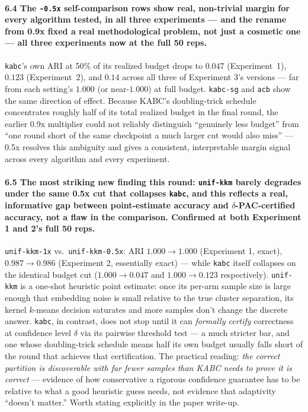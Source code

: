 \documentclass[11pt]{article}
\begin{document}
\paragraph{6.4 The \texttt{-0.5x} self-comparison rows show real,
non-trivial margin for every algorithm tested, in all three experiments
--- and the rename from 0.9x fixed a real methodological problem, not just
a cosmetic one --- all three experiments now at the full 50 reps.}
\texttt{kabc}'s own ARI at 50\% of its realized budget drops to $0.047$
(Experiment~1), $0.123$ (Experiment~2), and $0.14$ across all three of
Experiment 3's versions --- far from each setting's $1.000$ (or
near-$1.000$) at full budget. \texttt{kabc-sg} and \texttt{acb} show the
same direction of
effect. Because KABC's doubling-trick schedule concentrates roughly half
of its total realized budget in the final round, the earlier 0.9x
multiplier could not reliably distinguish ``genuinely less budget'' from
``one round short of the same checkpoint a much larger cut would also
miss'' --- 0.5x resolves this ambiguity and gives a consistent,
interpretable margin signal across every algorithm and every experiment.

\paragraph{6.5 The most striking new finding this round: \texttt{unif-kkm}
barely degrades under the same 0.5x cut that collapses \texttt{kabc}, and
this reflects a real, informative gap between point-estimate accuracy and
$\delta$-PAC-certified accuracy, not a flaw in the comparison. Confirmed
at both Experiment 1 and 2's full 50 reps.} \texttt{unif-kkm-1x} vs.\
\texttt{unif-kkm-0.5x}: ARI $1.000\to1.000$ (Experiment 1, exact),
$0.987\to0.986$ (Experiment 2, essentially exact) --- while \texttt{kabc}
itself collapses on the identical budget cut ($1.000\to0.047$ and
$1.000\to0.123$ respectively). \texttt{unif-kkm} is a
one-shot heuristic point estimate: once its per-arm sample size is large
enough that embedding noise is small relative to the true cluster
separation, its kernel $k$-means decision saturates and more samples don't
change the discrete answer. \texttt{kabc}, in contrast, does not stop
until it can \emph{formally certify} correctness at confidence level
$\delta$ via its pairwise threshold test --- a much stricter bar, and one
whose doubling-trick schedule means half its own budget usually falls
short of the round that achieves that certification. The practical
reading: \emph{the correct partition is discoverable with far fewer
samples than KABC needs to prove it is correct} --- evidence of how
conservative a rigorous confidence guarantee has to be relative to what a
good heuristic guess needs, not evidence that adaptivity ``doesn't
matter.'' Worth stating explicitly in the paper write-up.
\end{document}
